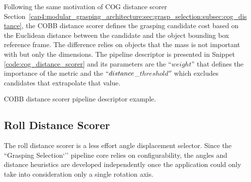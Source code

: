 Following the same motivation of \ac{COG} distance scorer Section~\ref{cap4:modular_grasping_architecture:sec:grasp_selection:subsec:cog_distance}, the \ac{COBB} distance scorer defines the grasping candidate cost based on the Euclidean distance between the candidate and the object bounding box reference frame. The difference relies on objects that the mass is not important with but only the dimensions. The pipeline descriptor is presented in Snippet \ref{code:cog_distance_scorer} and its parameters are the ``$weight$'' that defines the importance of the metric and the $``distance$\_$threshold''$ which excludes candidates that extrapolate that value.



\begin{snippet}[h!]
\centering
{}
\caption{\ac{COBB} distance scorer pipeline descriptor example.}
\label{code:cobb_distance_scorer}
\end{snippet}

\subsection{Roll Distance Scorer}
\label{cap4:modular_grasping_architecture:sec:grasp_selection:subsec:roll_distance}

The roll distance scorer is a less effort angle displacement selector. Since the ``Grasping Selection`'' pipeline core relies on configurability, the angles and distance heuristics are developed independently once the application could only take into consideration only a single rotation axis.

